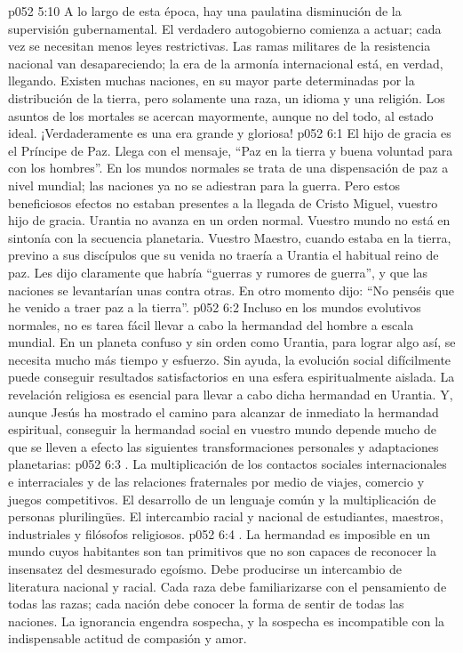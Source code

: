 \vs p052 5:10 A lo largo de esta época, hay una paulatina disminución de la supervisión gubernamental. El verdadero autogobierno comienza a actuar; cada vez se necesitan menos leyes restrictivas. Las ramas militares de la resistencia nacional van desapareciendo; la era de la armonía internacional está, en verdad, llegando. Existen muchas naciones, en su mayor parte determinadas por la distribución de la tierra, pero solamente una raza, un idioma y una religión. Los asuntos de los mortales se acercan mayormente, aunque no del todo, al estado ideal. ¡Verdaderamente es una era grande y gloriosa!
\vs p052 6:1 El hijo de gracia es el Príncipe de Paz. Llega con el mensaje, “Paz en la tierra y buena voluntad para con los hombres”. En los mundos normales se trata de una dispensación de paz a nivel mundial; las naciones ya no se adiestran para la guerra. Pero estos beneficiosos efectos no estaban presentes a la llegada de Cristo Miguel, vuestro hijo de gracia. Urantia no avanza en un orden normal. Vuestro mundo no está en sintonía con la secuencia planetaria. Vuestro Maestro, cuando estaba en la tierra, previno a sus discípulos que su venida no traería a Urantia el habitual reino de paz. Les dijo claramente que habría “guerras y rumores de guerra”, y que las naciones se levantarían unas contra otras. En otro momento dijo: “No penséis que he venido a traer paz a la tierra”.
\vs p052 6:2 Incluso en los mundos evolutivos normales, no es tarea fácil llevar a cabo la hermandad del hombre a escala mundial. En un planeta confuso y sin orden como Urantia, para lograr algo así, se necesita mucho más tiempo y esfuerzo. Sin ayuda, la evolución social difícilmente puede conseguir resultados satisfactorios en una esfera espiritualmente aislada. La revelación religiosa es esencial para llevar a cabo dicha hermandad en Urantia. Y, aunque Jesús ha mostrado el camino para alcanzar de inmediato la hermandad espiritual, conseguir la hermandad social en vuestro mundo depende mucho de que se lleven a efecto las siguientes transformaciones personales y adaptaciones planetarias:
\vs p052 6:3 . La multiplicación de los contactos sociales internacionales e interraciales y de las relaciones fraternales por medio de viajes, comercio y juegos competitivos. El desarrollo de un lenguaje común y la multiplicación de personas plurilingües. El intercambio racial y nacional de estudiantes, maestros, industriales y filósofos religiosos.
\vs p052 6:4 . La hermandad es imposible en un mundo cuyos habitantes son tan primitivos que no son capaces de reconocer la insensatez del desmesurado egoísmo. Debe producirse un intercambio de literatura nacional y racial. Cada raza debe familiarizarse con el pensamiento de todas las razas; cada nación debe conocer la forma de sentir de todas las naciones. La ignorancia engendra sospecha, y la sospecha es incompatible con la indispensable actitud de compasión y amor.
